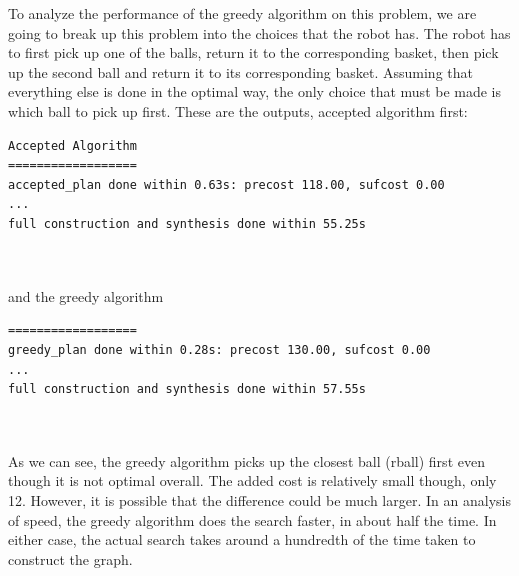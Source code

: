 To analyze the performance of the greedy algorithm on this problem, we are going to break up this problem into the choices that the robot has. The robot has to first pick up one of the balls, return it to the corresponding basket, then pick up the second ball and return it to its corresponding basket. Assuming that everything else is done in the optimal way, the only choice that must be made is which ball to pick up first. These are the outputs, accepted algorithm first: \\


\begin{minipage}{\textwidth}
\begingroup
\fontsize{9pt}{12pt}\selectfont
\begin{lstlisting}
Accepted Algorithm
==================
accepted_plan done within 0.63s: precost 118.00, sufcost 0.00
...
full construction and synthesis done within 55.25s 
\end{lstlisting}
\endgroup
\end{minipage} \\ \\


and the greedy algorithm \\


\begin{minipage}{\textwidth}
\begingroup
\fontsize{9pt}{12pt}\selectfont
\begin{lstlisting}
==================
greedy_plan done within 0.28s: precost 130.00, sufcost 0.00
...
full construction and synthesis done within 57.55s 
\end{lstlisting}
\endgroup
\end{minipage} \\ \\


As we can see, the greedy algorithm picks up the closest ball (rball) first even though it is not optimal overall. The added cost is relatively small though, only 12. However, it is possible that the difference could be much larger. In an analysis of speed, the greedy algorithm does the search faster, in about half the time. In either case, the actual search takes around a hundredth of the time taken to construct the graph.

